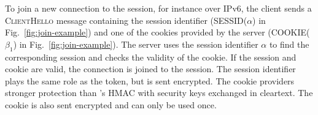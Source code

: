 To join a new \tcp connection to the \tcpls session, for instance over IPv6, the client sends a \textsc{ClientHello} message containing the session identifier (SESSID($\alpha$) in Fig.~\ref{fig:join-example}) and one of the
cookies provided by the server (COOKIE($\beta_1$) in Fig.~\ref{fig:join-example}). The server uses the session identifier $\alpha$ to find the corresponding \tcpls session and checks the validity of the cookie. If the \tcpls session and cookie are valid, the \tcp connection is joined to the \tcpls session. The session identifier plays the same role as the \mptcp token, but is sent encrypted. The cookie providers stronger protection than \mptcp's HMAC with security keys exchanged in cleartext. The cookie is also sent encrypted and can only be used once.



